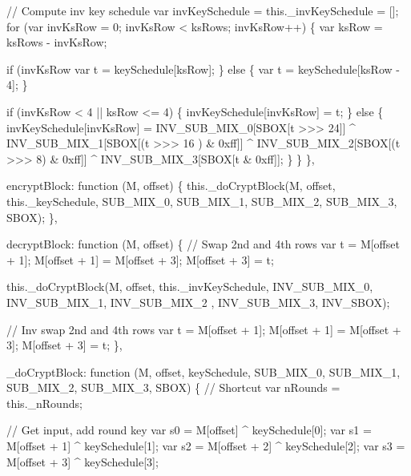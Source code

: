 \begin{DoxyCodeInclude}
            \textcolor{comment}{// Compute inv key schedule}
            var invKeySchedule = this.\_invKeySchedule = [];
            \textcolor{keywordflow}{for} (var invKsRow = 0; invKsRow < ksRows; invKsRow++) \{
                var ksRow = ksRows - invKsRow;

                \textcolor{keywordflow}{if} (invKsRow %
                    var t = keySchedule[ksRow];
                \} \textcolor{keywordflow}{else} \{
                    var t = keySchedule[ksRow - 4];
                \}

                \textcolor{keywordflow}{if} (invKsRow < 4 || ksRow <= 4) \{
                    invKeySchedule[invKsRow] = t;
                \} \textcolor{keywordflow}{else} \{
                    invKeySchedule[invKsRow] = INV\_SUB\_MIX\_0[SBOX[t >>> 24]] ^ INV\_SUB\_MIX\_1[SBOX[(t >>> 16
      ) & 0xff]] ^
                                               INV\_SUB\_MIX\_2[SBOX[(t >>> 8) & 0xff]] ^ INV\_SUB\_MIX\_3[SBOX[t
       & 0xff]];
                \}
            \}
        \},

        encryptBlock: \textcolor{keyword}{function} (M, offset) \{
            this.\_doCryptBlock(M, offset, this.\_keySchedule, SUB\_MIX\_0, SUB\_MIX\_1, SUB\_MIX\_2, SUB\_MIX\_3, 
      SBOX);
        \},

        decryptBlock: \textcolor{keyword}{function} (M, offset) \{
            \textcolor{comment}{// Swap 2nd and 4th rows}
            var t = M[offset + 1];
            M[offset + 1] = M[offset + 3];
            M[offset + 3] = t;

            this.\_doCryptBlock(M, offset, this.\_invKeySchedule, INV\_SUB\_MIX\_0, INV\_SUB\_MIX\_1, INV\_SUB\_MIX\_2
      , INV\_SUB\_MIX\_3, INV\_SBOX);

            \textcolor{comment}{// Inv swap 2nd and 4th rows}
            var t = M[offset + 1];
            M[offset + 1] = M[offset + 3];
            M[offset + 3] = t;
        \},

        \_doCryptBlock: \textcolor{keyword}{function} (M, offset, keySchedule, SUB\_MIX\_0, SUB\_MIX\_1, SUB\_MIX\_2, SUB\_MIX\_3, SBOX) 
      \{
            \textcolor{comment}{// Shortcut}
            var nRounds = this.\_nRounds;

            \textcolor{comment}{// Get input, add round key}
            var s0 = M[offset]     ^ keySchedule[0];
            var s1 = M[offset + 1] ^ keySchedule[1];
            var s2 = M[offset + 2] ^ keySchedule[2];
            var s3 = M[offset + 3] ^ keySchedule[3];


\end{DoxyCodeInclude}
